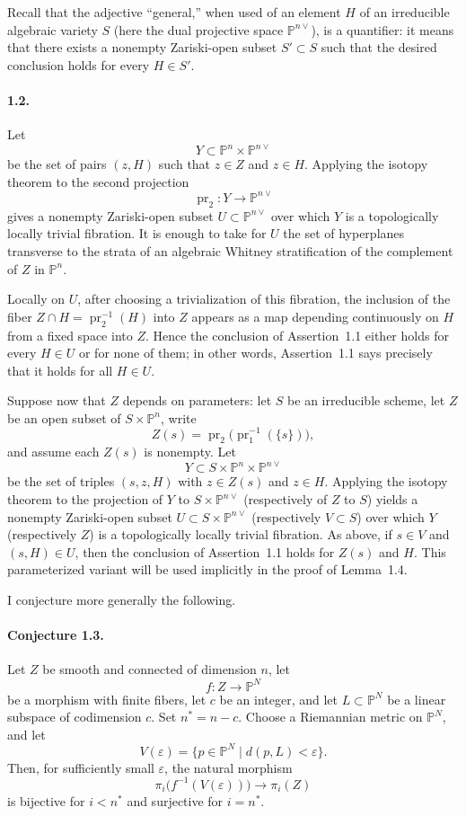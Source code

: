 \documentclass[11pt]{amsart}
\newcommand{\PP}{\mathbb{P}}
\begin{document}
Recall that the adjective ``general,'' when used of an element $H$ of an irreducible algebraic variety $S$ (here the dual projective space $\PP^{n\vee}$), is a quantifier: it means that there exists a nonempty Zariski-open subset $S'\subset S$ such that the desired conclusion holds for every $H\in S'$.

\paragraph{\textbf{1.2.}}
Let
\[
Y\subset \PP^n\times \PP^{n\vee}
\]
be the set of pairs $(z,H)$ such that $z\in Z$ and $z\in H$. Applying the isotopy theorem to the second projection
\[
\operatorname{pr}_2\colon Y\to \PP^{n\vee}
\]
gives a nonempty Zariski-open subset $U\subset \PP^{n\vee}$ over which $Y$ is a topologically locally trivial fibration. It is enough to take for $U$ the set of hyperplanes transverse to the strata of an algebraic Whitney stratification of the complement of $Z$ in $\PP^n$.

Locally on $U$, after choosing a trivialization of this fibration, the inclusion of the fiber $Z\cap H=\operatorname{pr}_2^{-1}(H)$ into $Z$ appears as a map depending continuously on $H$ from a fixed space into $Z$. Hence the conclusion of Assertion~1.1 either holds for every $H\in U$ or for none of them; in other words, Assertion~1.1 says precisely that it holds for all $H\in U$.

Suppose now that $Z$ depends on parameters: let $S$ be an irreducible scheme, let $Z$ be an open subset of $S\times \PP^n$, write
\[
Z(s)=\operatorname{pr}_2\bigl(\operatorname{pr}_1^{-1}(\{s\})\bigr),
\]
and assume each $Z(s)$ is nonempty. Let
\[
Y\subset S\times \PP^n\times \PP^{n\vee}
\]
be the set of triples $(s,z,H)$ with $z\in Z(s)$ and $z\in H$. Applying the isotopy theorem to the projection of $Y$ to $S\times \PP^{n\vee}$ (respectively of $Z$ to $S$) yields a nonempty Zariski-open subset $U\subset S\times \PP^{n\vee}$ (respectively $V\subset S$) over which $Y$ (respectively $Z$) is a topologically locally trivial fibration. As above, if $s\in V$ and $(s,H)\in U$, then the conclusion of Assertion~1.1 holds for $Z(s)$ and $H$. This parameterized variant will be used implicitly in the proof of Lemma~1.4.

I conjecture more generally the following.

\paragraph{\textbf{Conjecture 1.3.}}
Let $Z$ be smooth and connected of dimension $n$, let
\[
f\colon Z\to \PP^N
\]
be a morphism with finite fibers, let $c$ be an integer, and let $L\subset \PP^N$ be a linear subspace of codimension $c$. Set $n^*=n-c$. Choose a Riemannian metric on $\PP^N$, and let
\[
V(\varepsilon)=\{p\in \PP^N\mid d(p,L)<\varepsilon\}.
\]
Then, for sufficiently small $\varepsilon$, the natural morphism
\[
\pi_i\bigl(f^{-1}(V(\varepsilon))\bigr)\to \pi_i(Z)
\]
is bijective for $i<n^*$ and surjective for $i=n^*$.
\end{document}
